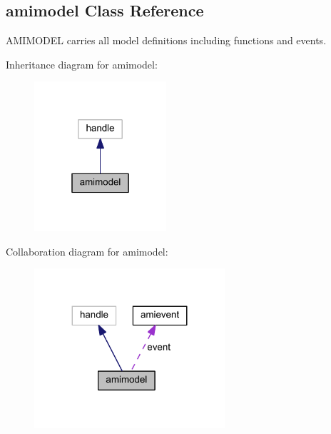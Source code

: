 \hypertarget{classamimodel}{}\subsection{amimodel Class Reference}
\label{classamimodel}


A\+M\+I\+M\+O\+D\+E\+L carries all model definitions including functions and events.  




Inheritance diagram for amimodel\+:\nopagebreak
\begin{figure}[H]
\begin{center}
\leavevmode
\includegraphics[width=139pt]{classamimodel__inherit__graph}
\end{center}
\end{figure}


Collaboration diagram for amimodel\+:\nopagebreak
\begin{figure}[H]
\begin{center}
\leavevmode
\includegraphics[width=200pt]{classamimodel__coll__graph}
\end{center}
\end{figure}
